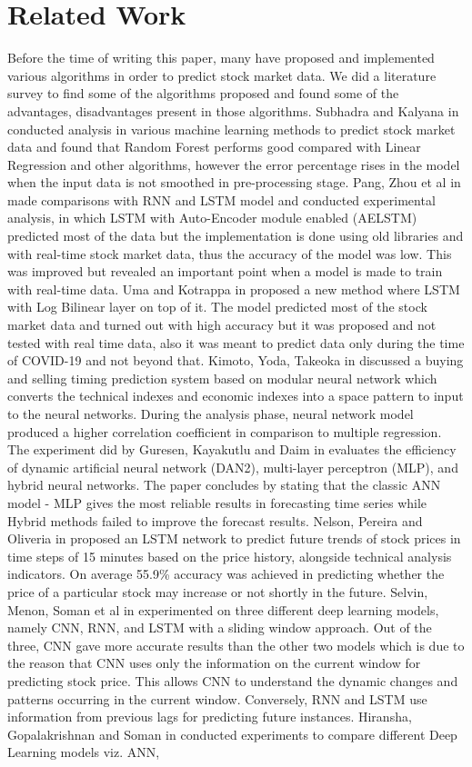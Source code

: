 \documentclass[conference]{IEEEtran}
\begin{document}
\section{Related Work}

Before the time of writing this paper, many have proposed and implemented various algorithms in order to predict stock market data. We did a literature survey to find some of the algorithms proposed and found some of the advantages, disadvantages present in those algorithms. Subhadra and Kalyana in \cite{b1} conducted analysis in various machine learning methods to predict stock market data and found that Random Forest performs good compared with Linear Regression and other algorithms, however the error percentage rises in the model when the input data is not smoothed in pre-processing stage. Pang, Zhou et al in \cite{b2} made comparisons with RNN and LSTM model and conducted experimental analysis, in which LSTM with Auto-Encoder module enabled (AELSTM) predicted most of the data but the implementation is done using old libraries and with real-time stock market data, thus the accuracy of the model was low. This was improved but revealed an important point when a model is made to train with real-time data. Uma and Kotrappa in \cite{b3} proposed a new method where LSTM with Log Bilinear layer on top of it. The model predicted most of the stock market data and turned out with high accuracy but it was proposed and not tested with real time data, also it was meant to predict data only during the time of COVID-19 and not beyond that. Kimoto, Yoda, Takeoka in \cite{b4} discussed a buying and selling timing prediction system based on modular neural network which converts the technical indexes and economic indexes into a space pattern to input to the neural networks. During the analysis phase, neural network model produced a higher correlation coefficient in comparison to multiple regression. The experiment did by Guresen, Kayakutlu and Daim in \cite{b5} evaluates the efficiency of dynamic artificial neural network (DAN2), multi-layer perceptron (MLP), and hybrid neural networks. The paper concludes by stating that the classic ANN model - MLP gives the most reliable results in forecasting time series while Hybrid methods failed to improve the forecast results. Nelson, Pereira and Oliveria in \cite{b6} proposed an LSTM network to predict future trends of stock prices in time steps of 15 minutes based on the price history, alongside technical analysis indicators. On average  55.9\% accuracy was achieved in predicting whether the price of a particular stock may increase or not shortly in the future. Selvin, Menon, Soman et al in \cite{b7} experimented on three different deep learning models, namely CNN, RNN, and LSTM with a sliding window approach. Out of the three, CNN gave more accurate results than the other two models which is due to the reason that CNN uses only the information on the current window for predicting stock price. This allows CNN  to understand the dynamic changes and patterns occurring in the current window. Conversely, RNN and LSTM use information from previous lags for predicting future instances. Hiransha, Gopalakrishnan and Soman in \cite{b8} conducted experiments to compare different Deep Learning models viz. ANN, 
\end{document}
